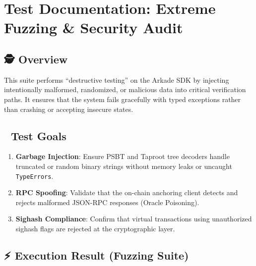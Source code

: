 \documentclass[
]{article}
\author{}
\date{}
\providecommand{\tightlist}{%
  \setlength{\itemsep}{0pt}\setlength{\parskip}{0pt}}
\begin{document}
\hypertarget{test-documentation-extreme-fuzzing-security-audit}{%
\section{Test Documentation: Extreme Fuzzing \& Security
Audit}\label{test-documentation-extreme-fuzzing-security-audit}}

\hypertarget{overview}{%
\subsection{🕵️ Overview}\label{overview}}

This suite performs ``destructive testing'' on the Arkade SDK by
injecting intentionally malformed, randomized, or malicious data into
critical verification paths. It ensures that the system fails gracefully
with typed exceptions rather than crashing or accepting insecure states.

\hypertarget{test-goals}{%
\subsection{🎯 Test Goals}\label{test-goals}}

\begin{enumerate}
\def\labelenumi{\arabic{enumi}.}
\tightlist
\item
  \textbf{Garbage Injection}: Ensure PSBT and Taproot tree decoders
  handle truncated or random binary strings without memory leaks or
  uncaught \texttt{TypeErrors}.
\item
  \textbf{RPC Spoofing}: Validate that the on-chain anchoring client
  detects and rejects malformed JSON-RPC responses (Oracle Poisoning).
\item
  \textbf{Sighash Compliance}: Confirm that virtual transactions using
  unauthorized sighash flags are rejected at the cryptographic layer.
\end{enumerate}

\hypertarget{execution-result-fuzzing-suite}{%
\subsection{⚡ Execution Result (Fuzzing
Suite)}\label{execution-result-fuzzing-suite}}
\end{document}
